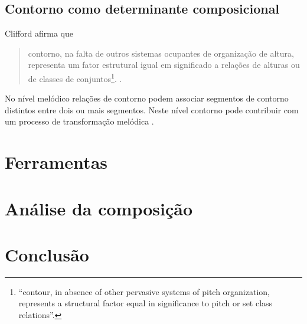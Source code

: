 \documentclass[12pt,brazil]{book}
\newcommand{\citacaoindt}[4]{
  \begin{quote}
    \normalsize
    {#2}\footnote{
      \selectlanguage{brazil}
      ``{#1}''.
    }.
    \selectlanguage{brazil}
    \cite[#3]{#4}.
  \end{quote}
}
\begin{document}
\section{Contorno como determinante composicional}
\label{sec:cont-como-determ}

Clifford afirma que

\citacaoindt{contour, in absence of other pervasive systems of pitch
  organization, represents a structural factor equal in significance
  to pitch or set class relations}{contorno, na falta de outros
  sistemas ocupantes de organização de altura, representa um fator
  estrutural igual em significado a relações de alturas ou de classes
  de conjuntos}{p. 157}{clifford95:contour}

No nível melódico relações de contorno podem associar segmentos de
contorno distintos entre dois ou mais segmentos. Neste nível contorno
pode contribuir com um processo de transformação melódica
\cite[p. 159]{clifford95:contour}.

\chapter{Ferramentas}
\label{cha:ferramentas}

\chapter{Análise da composição}
\label{cha:anal-da-comp}

\chapter{Conclusão}
\label{cha:conclusao}






\printglossary[title=Glossário]
\end{document}
